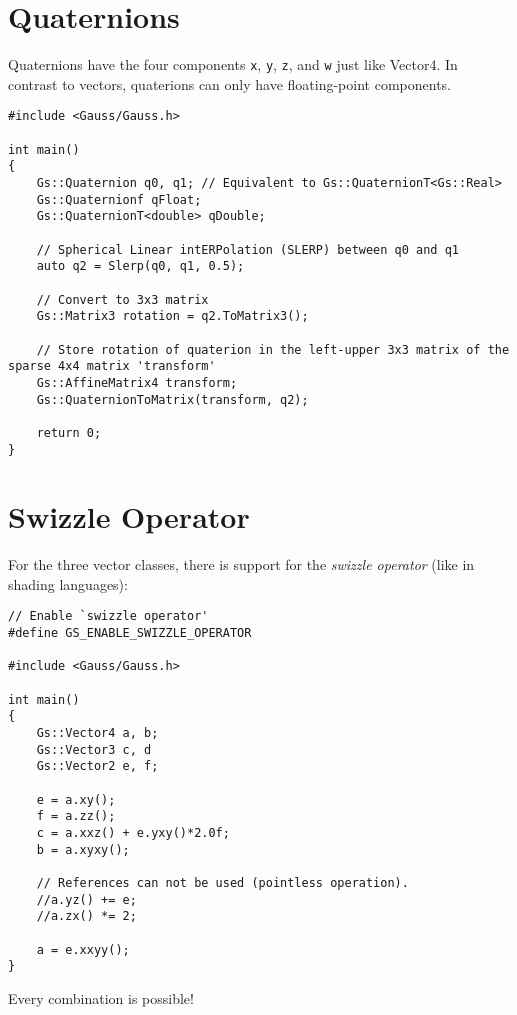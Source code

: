 \documentclass{article}
\begin{document}

\section*{Quaternions}

Quaternions have the four components \texttt{x}, \texttt{y}, \texttt{z}, and \texttt{w} just like Vector4.
In contrast to vectors, quaterions can only have floating-point components.
\begin{lstlisting}
#include <Gauss/Gauss.h>

int main()
{
	Gs::Quaternion q0, q1; // Equivalent to Gs::QuaternionT<Gs::Real>
	Gs::Quaternionf qFloat;
	Gs::QuaternionT<double> qDouble;
	
	// Spherical Linear intERPolation (SLERP) between q0 and q1
	auto q2 = Slerp(q0, q1, 0.5);
	
	// Convert to 3x3 matrix
	Gs::Matrix3 rotation = q2.ToMatrix3();
	
	// Store rotation of quaterion in the left-upper 3x3 matrix of the sparse 4x4 matrix 'transform'
	Gs::AffineMatrix4 transform;
	Gs::QuaternionToMatrix(transform, q2);
	
	return 0;
}
\end{lstlisting}



\section*{Swizzle Operator}

For the three vector classes, there is support for the \textit{swizzle operator} (like in shading languages):
\begin{lstlisting}
// Enable `swizzle operator'
#define GS_ENABLE_SWIZZLE_OPERATOR

#include <Gauss/Gauss.h>

int main()
{
	Gs::Vector4 a, b;
	Gs::Vector3 c, d
	Gs::Vector2 e, f;
	
	e = a.xy();
	f = a.zz();
	c = a.xxz() + e.yxy()*2.0f;
	b = a.xyxy();
	
	// References can not be used (pointless operation).
	//a.yz() += e;
	//a.zx() *= 2;
	
	a = e.xxyy();
}
\end{lstlisting}
Every combination is possible!
\end{document}
